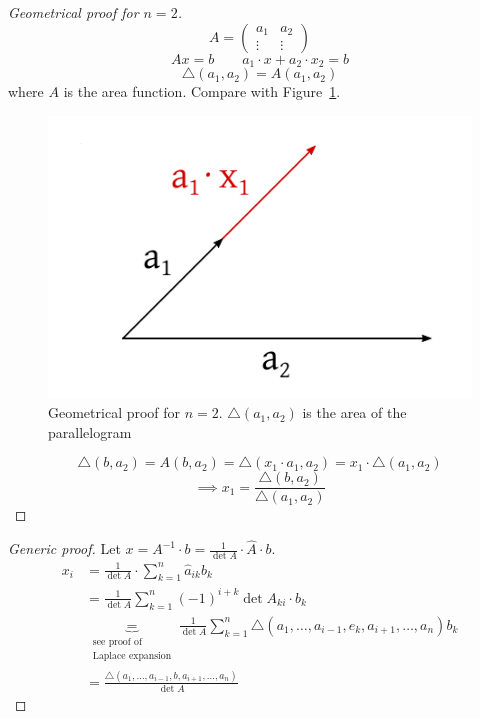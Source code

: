 \documentclass{article}
\numberwithin{lecref}{section}
\begin{document}
\begin{proof}[Geometrical proof for $n=2$]
  \[ A = \begin{pmatrix} a_1 & a_2 \\ \vdots & \vdots \end{pmatrix} \]
  \[ Ax = b \qquad a_1 \cdot x + a_2 \cdot x_2 = b \]
  \[ \triangle (a_1, a_2) = A(a_1, a_2) \]
  where $A$ is the area function. Compare with Figure~\ref{img:geomn2}.

  \begin{figure}[h]
    \includegraphics{img/02b_geometrical_proof_for_n2.pdf}
    \caption{Geometrical proof for $n=2$. $\triangle(a_1, a_2)$ is the area of the parallelogram}
    \label{img:geomn2}
  \end{figure}

  \[ \triangle(b, a_2) = A(b, a_2) = \triangle(x_1 \cdot a_1, a_2) = x_1 \cdot \triangle(a_1, a_2) \]
  \[ \implies x_1 = \frac{\triangle (b, a_2)}{\triangle (a_1, a_2)} \]
\end{proof}

\begin{proof}[Generic proof]
  Let $x = A^{-1} \cdot b = \frac{1}{\det{A}} \cdot \hat{A} \cdot b$.
  \begin{align*}
    x_i &= \frac{1}{\det{A}} \cdot \sum_{k=1}^n \hat{a}_{ik} b_k \\
        &= \frac{1}{\det{A}} \sum_{k=1}^n (-1)^{i+k} \det{A_{ki}} \cdot b_k \\
        &\underbrace{=}_{\substack{\text{see proof of} \\ \text{Laplace expansion}}} \frac{1}{\det{A}} \sum_{k=1}^n \triangle(a_1, \dots, a_{i-1}, e_k, a_{i+1}, \dots, a_n) b_k \\
        &= \frac{\triangle(a_1, \dots, a_{i-1}, b, a_{i+1}, \dots, a_n)}{\det{A}}
  \end{align*}
\end{proof}
\end{document}
